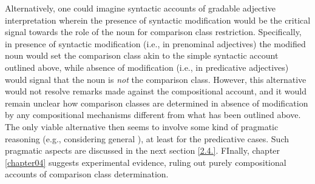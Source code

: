 Alternatively, one could imagine syntactic accounts of gradable adjective interpretation wherein the presence of syntactic modification would be the critical signal towards the role of the noun for comparison class restriction. Specifically, in presence of syntactic modification (i.e., in prenominal adjectives) the modified noun would set the comparison class akin to the simple syntactic account outlined above,  while absence of modification (i.e., in predicative adjectives) would signal that the noun is \emph{not} the comparison class. However, this alternative would not resolve remarks made against the compositional account, and it would remain unclear how comparison classes are determined in absence of modification by any compositional mechanisms different from what has been outlined above. The only viable alternative then seems to involve some kind of pragmatic reasoning (e.g., considering general \textcite[world knowledge][]{tessler2017warm}), at least for the predicative cases. Such pragmatic aspects are discussed in the next section \ref{2.4.}. FInally, chapter \ref{chapter04} suggests experimental evidence, ruling out purely compositional accounts of comparison class determination. 


